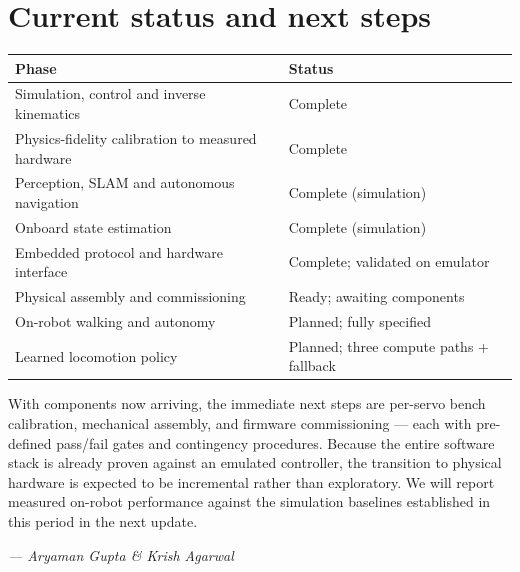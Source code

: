 \documentclass[11pt,a4paper]{article}
\begin{document}
\section{Current status and next steps}
\begin{center}\small
\renewcommand{\arraystretch}{1.35}
\begin{tabular}{>{\raggedright\arraybackslash}p{10.5cm} >{\raggedright\arraybackslash}p{5.9cm}}
\hline
\textbf{Phase} & \textbf{Status}\\
\hline
Simulation, control and inverse kinematics & Complete\\
Physics-fidelity calibration to measured hardware & Complete\\
Perception, SLAM and autonomous navigation & Complete (simulation)\\
Onboard state estimation & Complete (simulation)\\
Embedded protocol and hardware interface & Complete; validated on emulator\\
Physical assembly and commissioning & Ready; awaiting components\\
On-robot walking and autonomy & Planned; fully specified\\
Learned locomotion policy & Planned; three compute paths + fallback\\
\hline
\end{tabular}
\end{center}

\vspace{2mm}
With components now arriving, the immediate next steps are per-servo bench calibration, mechanical
assembly, and firmware commissioning --- each with pre-defined pass/fail gates and contingency
procedures. Because the entire software stack is already proven against an emulated controller, the
transition to physical hardware is expected to be incremental rather than exploratory. We will
report measured on-robot performance against the simulation baselines established in this period in
the next update.

\vspace{6mm}
\begin{center}\itshape --- Aryaman Gupta \& Krish Agarwal\end{center}
\end{document}
